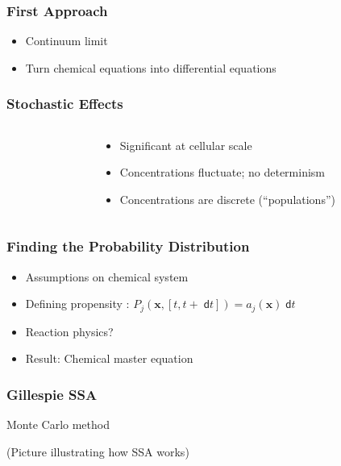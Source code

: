 \documentclass[xcolor={usenames,dvipsnames,svgnames}]{beamer}
\newcommand{\dee}{\;\mathsf{d}}
\renewcommand{\vec}[1]{\ensuremath{\mathbf{#1}}}
\begin{document}
\begin{frame}
    \frametitle{First Approach}
    \begin{itemize}
        \item Continuum limit
        \item Turn chemical equations into differential equations
    \end{itemize}
\end{frame}

\begin{frame}
    \frametitle{Stochastic Effects}
    \begin{columns}[c]
        \begin{column}{0.5\textwidth}
            \begin{center}
                \resizebox{\textwidth}{!}{
                    
                }
            \end{center}
        \end{column}
        \begin{column}{0.5\textwidth}
            \begin{itemize}
                \item Significant at cellular scale
                \item Concentrations fluctuate; no determinism
                \item Concentrations are discrete (``populations'')
            \end{itemize}
        \end{column}
    \end{columns}
\end{frame}

\begin{frame}
    \frametitle{Finding the Probability Distribution}

    \begin{itemize}
        \item Assumptions on chemical system
        \item Defining propensity \cite{gillespie-07}: $ P_j(\vec{x}, [t, t+\dee t]) = a_j(\vec{x})\dee t $
        \item Reaction physics?
        \item Result: Chemical master equation
    \end{itemize}
\end{frame}

\begin{frame}
    \frametitle{Gillespie SSA}
    Monte Carlo method

    (Picture illustrating how SSA works)
\end{frame}
\end{document}
